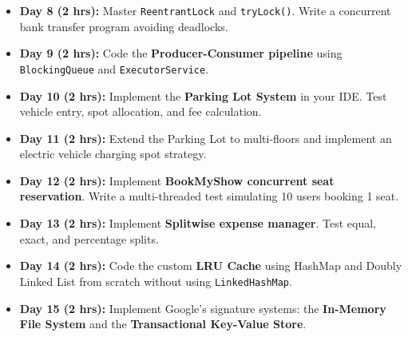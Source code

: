 \documentclass[10pt,journal,compsoc,onecolumn]{IEEEtran}
\begin{document}
\begin{itemize}
    \item \textbf{Day 8 (2 hrs):} Master \texttt{ReentrantLock} and \texttt{tryLock()}. Write a concurrent bank transfer program avoiding deadlocks.
    \item \textbf{Day 9 (2 hrs):} Code the \textbf{Producer-Consumer pipeline} using \texttt{BlockingQueue} and \texttt{ExecutorService}.
    \item \textbf{Day 10 (2 hrs):} Implement the \textbf{Parking Lot System} in your IDE. Test vehicle entry, spot allocation, and fee calculation.
    \item \textbf{Day 11 (2 hrs):} Extend the Parking Lot to multi-floors and implement an electric vehicle charging spot strategy.
    \item \textbf{Day 12 (2 hrs):} Implement \textbf{BookMyShow concurrent seat reservation}. Write a multi-threaded test simulating 10 users booking 1 seat.
    \item \textbf{Day 13 (2 hrs):} Implement \textbf{Splitwise expense manager}. Test equal, exact, and percentage splits.
    \item \textbf{Day 14 (2 hrs):} Code the custom \textbf{LRU Cache} using HashMap and Doubly Linked List from scratch without using \texttt{LinkedHashMap}.
    \item \textbf{Day 15 (2 hrs):} Implement Google's signature systems: the \textbf{In-Memory File System} and the \textbf{Transactional Key-Value Store}.
\end{itemize}
\end{document}
